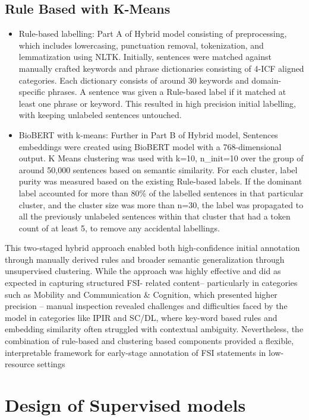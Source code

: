 \subsection{Rule Based with K-Means}

\begin{itemize}
    \item Rule-based labelling: Part A of Hybrid model consisting of preprocessing, which includes lowercasing, punctuation removal, tokenization, and lemmatization using NLTK. Initially, sentences were matched against manually crafted keywords and phrase dictionaries consisting of 4-ICF aligned categories. Each dictionary consists of around 30 keywords and domain-specific phrases. A sentence was given a Rule-based label if it matched at least one phrase or keyword. This resulted in high precision initial labelling, with keeping unlabeled sentences untouched. 
    \item BioBERT with k-means: Further in Part B of Hybrid model, Sentences embeddings were created using BioBERT model with a 768-dimensional output. K Means clustering was used with k=10, n\_init=10 over the group of around 50,000 sentences based on semantic similarity. For each cluster, label purity was measured based on the existing Rule-based labels. If the dominant label accounted for more than 80\% of the labelled sentences in that particular cluster, and the cluster size was more than n=30, the label was propagated to all the previously unlabeled sentences within that cluster that had a token count of at least 5, to remove any accidental labellings. \\
\end{itemize}
This two-staged hybrid approach enabled both high-confidence initial annotation through manually derived rules and broader semantic generalization through unsupervised clustering. While the approach was highly effective and did as expected in capturing structured FSI- related content– particularly in categories such as Mobility and Communication \& Cognition, which presented higher precision – manual inspection revealed challenges and difficulties faced by the model in categories like IPIR and SC/DL, where key-word based rules and embedding similarity often struggled with contextual ambiguity. Nevertheless, the combination of rule-based and clustering based components provided a flexible, interpretable framework for early-stage annotation of FSI statements in low-resource settings

 
\section{Design of Supervised models}

